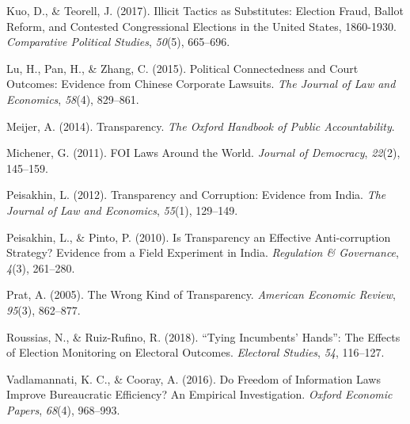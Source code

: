 \documentclass[]{article}
\begin{document}
\leavevmode\hypertarget{ref-KuoIllicitTacticsSubstitutes2017}{}%
Kuo, D., \& Teorell, J. (2017). Illicit Tactics as Substitutes: Election
Fraud, Ballot Reform, and Contested Congressional Elections in the
United States, 1860-1930. \emph{Comparative Political Studies},
\emph{50}(5), 665--696.

\leavevmode\hypertarget{ref-LuPoliticalConnectednessCourt2015}{}%
Lu, H., Pan, H., \& Zhang, C. (2015). Political Connectedness and Court
Outcomes: Evidence from Chinese Corporate Lawsuits. \emph{The Journal of
Law and Economics}, \emph{58}(4), 829--861.

\leavevmode\hypertarget{ref-MeijerTransparency2014}{}%
Meijer, A. (2014). Transparency. \emph{The Oxford Handbook of Public
Accountability}.

\leavevmode\hypertarget{ref-MichenerFOILawsWorld2011}{}%
Michener, G. (2011). FOI Laws Around the World. \emph{Journal of
Democracy}, \emph{22}(2), 145--159.

\leavevmode\hypertarget{ref-PeisakhinTransparencyCorruptionEvidence2012}{}%
Peisakhin, L. (2012). Transparency and Corruption: Evidence from India.
\emph{The Journal of Law and Economics}, \emph{55}(1), 129--149.

\leavevmode\hypertarget{ref-PeisakhinTransparencyEffectiveAnticorruption2010}{}%
Peisakhin, L., \& Pinto, P. (2010). Is Transparency an Effective
Anti-corruption Strategy? Evidence from a Field Experiment in India.
\emph{Regulation \& Governance}, \emph{4}(3), 261--280.

\leavevmode\hypertarget{ref-PratWrongKindTransparency2005}{}%
Prat, A. (2005). The Wrong Kind of Transparency. \emph{American Economic
Review}, \emph{95}(3), 862--877.

\leavevmode\hypertarget{ref-RoussiasTyingIncumbentsHands2018}{}%
Roussias, N., \& Ruiz-Rufino, R. (2018). ``Tying Incumbents' Hands'':
The Effects of Election Monitoring on Electoral Outcomes.
\emph{Electoral Studies}, \emph{54}, 116--127.

\leavevmode\hypertarget{ref-VadlamannatiFreedomInformationLaws2016}{}%
Vadlamannati, K. C., \& Cooray, A. (2016). Do Freedom of Information
Laws Improve Bureaucratic Efficiency? An Empirical Investigation.
\emph{Oxford Economic Papers}, \emph{68}(4), 968--993.
\end{document}
